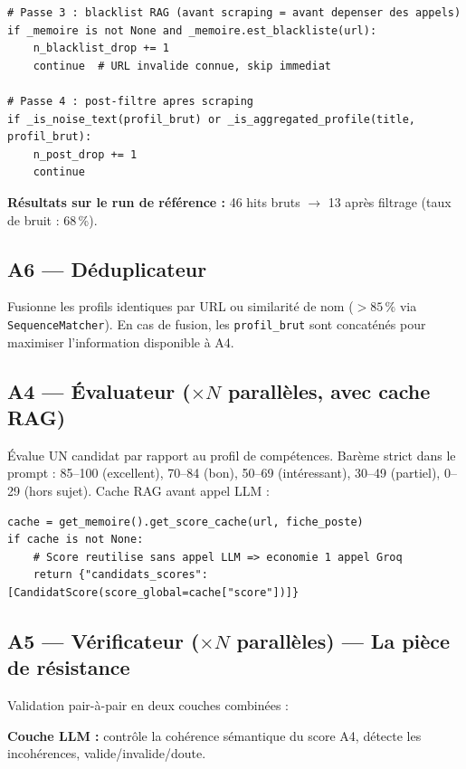 \documentclass[12pt,a4paper]{report}
\begin{document}
\begin{lstlisting}[caption={src/agents/chercheur\_filtre.py --- Blacklist RAG}]
# Passe 3 : blacklist RAG (avant scraping = avant depenser des appels)
if _memoire is not None and _memoire.est_blackliste(url):
    n_blacklist_drop += 1
    continue  # URL invalide connue, skip immediat

# Passe 4 : post-filtre apres scraping
if _is_noise_text(profil_brut) or _is_aggregated_profile(title, profil_brut):
    n_post_drop += 1
    continue
\end{lstlisting}

\textbf{Résultats sur le run de référence :} 46 hits bruts $\to$ 13 après filtrage
(taux de bruit : 68\,\%).

\subsection{A6 --- Déduplicateur}

Fusionne les profils identiques par URL ou similarité de nom ($>85\,\%$ via
\texttt{SequenceMatcher}). En cas de fusion, les \texttt{profil\_brut} sont
concaténés pour maximiser l'information disponible à A4.

\subsection{A4 --- Évaluateur ($\times N$ parallèles, avec cache RAG)}

Évalue UN candidat par rapport au profil de compétences. Barème strict dans le
prompt : 85--100 (excellent), 70--84 (bon), 50--69 (intéressant), 30--49 (partiel),
0--29 (hors sujet). Cache RAG avant appel LLM :

\begin{lstlisting}[caption={src/agents/evaluateur.py --- Cache RAG}]
cache = get_memoire().get_score_cache(url, fiche_poste)
if cache is not None:
    # Score reutilise sans appel LLM => economie 1 appel Groq
    return {"candidats_scores": [CandidatScore(score_global=cache["score"])]}
\end{lstlisting}

\subsection{A5 --- Vérificateur ($\times N$ parallèles) --- La pièce de résistance}

Validation pair-à-pair en deux couches combinées :

\textbf{Couche LLM :} contrôle la cohérence sémantique du score A4, détecte les
incohérences, valide/invalide/doute.
\end{document}
